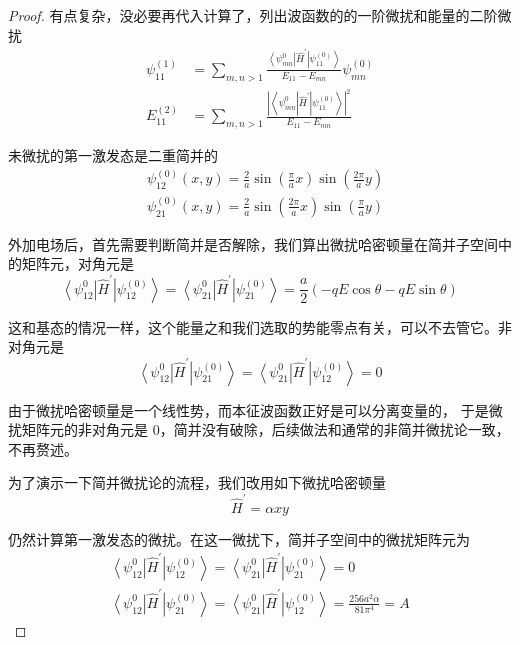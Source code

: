 \begin{proof}
有点复杂，没必要再代入计算了，列出波函数的的一阶微扰和能量的二阶微扰
$$\begin{aligned}
\psi_{11}^{(1)} & =\sum_{m, n>1} \frac{\left\langle\psi_{m n}^{0}\right| \hat{H}^{\prime}\left|\psi_{11}^{(0)}\right\rangle}{E_{11}-E_{m n}} \psi_{m n}^{(0)} \\
E_{11}^{(2)} & =\sum_{m, n>1} \frac{\left|\left\langle\psi_{m n}^{0}| \hat{H}^{\prime}| \psi_{11}^{(0)}\right\rangle\right|^{2}}{E_{11}-E_{m n}}
\end{aligned}$$

未微扰的第一激发态是二重简并的
$$\begin{aligned}
& \psi_{12}^{(0)}(x, y)=\frac{2}{a} \sin \left(\frac{\pi}{a} x\right) \sin \left(\frac{2 \pi}{a} y\right) \\
& \psi_{21}^{(0)}(x, y)=\frac{2}{a} \sin \left(\frac{2 \pi}{a} x\right) \sin \left(\frac{\pi}{a} y\right)
\end{aligned}$$

外加电场后，首先需要判断简并是否解除，我们算出微扰哈密顿量在简并子空间中的矩阵元，对角元是
$$\left\langle\psi_{12}^{0}\right| \hat{H}^{\prime}\left|\psi_{12}^{(0)}\right\rangle
=\left\langle\psi_{21}^{0}\right| \hat{H}^{\prime}\left|\psi_{21}^{(0)}\right\rangle
=\frac{a}{2}(-q E \cos \theta-q E \sin \theta)$$

这和基态的情况一样，这个能量之和我们选取的势能零点有关，可以不去管它。非对角元是
$$\left\langle\psi_{12}^{0}\right| \hat{H}^{\prime}\left|\psi_{21}^{(0)}\right\rangle
=\left\langle\psi_{21}^{0}\right| \hat{H}^{\prime}\left|\psi_{12}^{(0)}\right\rangle=0$$

由于微扰哈密顿量是一个线性势，而本征波函数正好是可以分离变量的，
于是微扰矩阵元的非对角元是 $0$，简并没有破除，后续做法和通常的非简并微扰论一致，不再赘述。

为了演示一下简并微扰论的流程，我们改用如下微扰哈密顿量
$$\hat{H}^{\prime}=\alpha x y$$

仍然计算第一激发态的微扰。在这一微扰下，简并子空间中的微扰矩阵元为
$$
\begin{gathered}
\left\langle\psi_{12}^{0}\right| \hat{H}^{\prime}\left|\psi_{12}^{(0)}\right\rangle=\left\langle\psi_{21}^{0}\right| \hat{H}^{\prime}\left|\psi_{21}^{(0)}\right\rangle=0 \\
\left\langle\psi_{12}^{0}\right| \hat{H}^{\prime}\left|\psi_{21}^{(0)}\right\rangle=\left\langle\psi_{21}^{0}\right| \hat{H}^{\prime}\left|\psi_{12}^{(0)}\right\rangle=\frac{256 a^{2} \alpha}{81 \pi^{4}}=A
\end{gathered}
$$


\end{proof}
